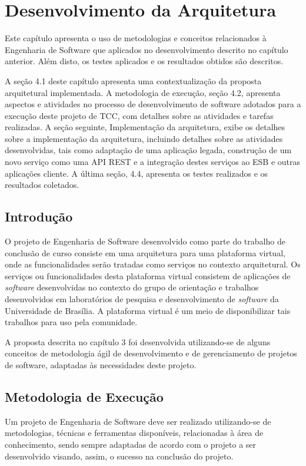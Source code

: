 \chapter[Desenvolvimento da Arquitetura]{Desenvolvimento da Arquitetura}

Este capítulo apresenta o uso de metodologias e conceitos relacionados à Engenharia de Software que aplicados no desenvolvimento descrito no capítulo anterior. Além disto, os testes aplicados e os resultados obtidos são descritos.

A seção 4.1 deste capítulo apresenta uma contextualização da proposta arquitetural implementada. A metodologia de execução, seção 4.2, apresenta aspectos e atividades no processo de desenvolvimento de software adotados para a execução deste projeto de TCC, com detalhes sobre as atividades  e tarefas realizadas. A seção seguinte, Implementação da arquitetura, exibe os detalhes sobre a implementação da arquitetura, incluindo detalhes sobre as atividades desenvolvidas, tais como adaptação de uma aplicação legada, construção de um novo serviço como uma API REST e a integração destes serviços ao ESB e outras aplicações cliente. A última seção, 4.4, apresenta os testes realizados e os resultados coletados.

\section{Introdução}
O projeto de Engenharia de Software desenvolvido como parte do trabalho de conclusão de curso consiste em uma arquitetura para uma plataforma virtual, onde as funcionalidades serão tratadas como serviços no contexto arquitetural. Os serviços ou funcionalidades desta plataforma virtual consistem de aplicações de \textit{software} desenvolvidas no contexto do grupo de orientação e trabalhos desenvolvidos em laboratórios de pesquisa e desenvolvimento de \textit{software} da Universidade de Brasília. A plataforma virtual é um meio de disponibilizar tais trabalhos para uso pela comunidade.

A proposta descrita no capítulo 3 foi desenvolvida utilizando-se de alguns conceitos de metodologia ágil de desenvolvimento e de gerenciamento de projetos de software, adaptadas às necessidades deste projeto.

\section{Metodologia de Execução}
Um projeto de Engenharia de Software deve ser realizado utilizando-se de metodologias, técnicas e ferramentas disponíveis, relacionadas à área de conhecimento, sendo sempre adaptadas de acordo com o projeto a ser desenvolvido visando, assim, o sucesso na conclusão do projeto.


